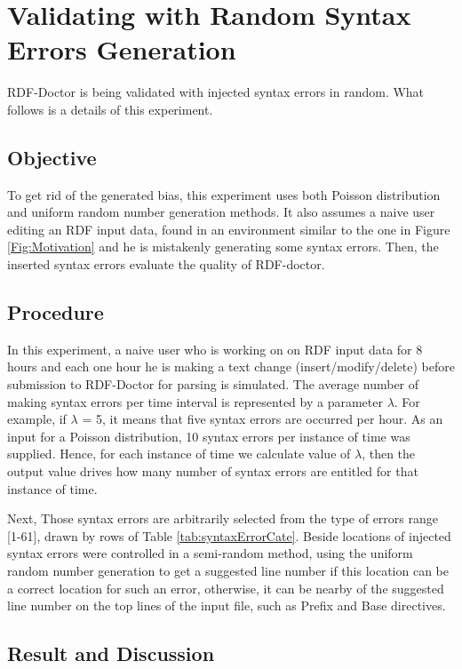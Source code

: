 \section{Validating with Random Syntax Errors Generation}
RDF-Doctor is being validated with injected syntax errors in random. What follows is a details of this experiment.
\subsection{Objective}
To get rid of the generated bias, this experiment uses both Poisson distribution and uniform random number generation methods. It also assumes a naive user editing an RDF input data, found in an environment similar to the one in Figure \ref{Fig:Motivation} and he is mistakenly generating some  syntax errors. Then, the inserted syntax errors evaluate the quality of RDF-doctor.


\subsection{Procedure}
 In this experiment, a naive user who is working on on RDF input data for 8 hours and each one hour he is making a text change (insert/modify/delete) before submission to RDF-Doctor for parsing is simulated. The average number of making syntax errors per time interval is represented by a parameter $\lambda$. For example, if   $\lambda$ = 5, it means that five syntax errors are occurred per hour.  As an input for a Poisson distribution, 10 syntax errors per instance of time was supplied. Hence, for each instance of time we calculate value of $\lambda$, then the output value drives how many number of syntax errors are entitled for that instance of time.
 
 Next, Those syntax errors are arbitrarily selected from the type of errors range [1-61], drawn by rows of Table \ref{tab:syntaxErrorCate}. Beside locations of injected syntax errors were controlled in a semi-random method, using the uniform random number generation to get a suggested line number if this location can be a correct location for such an error, otherwise, it can be nearby of the suggested line number on the top lines of the input file, such as Prefix and Base directives.   

\subsection{Result and Discussion}



